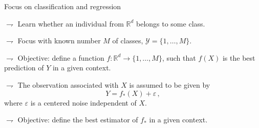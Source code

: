 \documentclass[xcolor={usenames,dvipsnames},handout]{beamer}
\begin{document}
\begin{frame}{Focus on classification and regression}


\vspace{.2cm} 

$\rightharpoondown$  Learn whether an individual from $\mathbb{R}^d$ \alert{belongs to some class}.

\vspace{.2cm} 

$\rightharpoondown$  Focus with \alert{known number $M$ of classes},   $\mathcal{Y} = \{1,\ldots,M\}$. 


\vspace{.2cm} 


$\rightharpoondown$   Objective: \alert{define a function $f: \mathbb{R}^d \to \{1,\ldots,M\}$}, such that $f(X)$ is the best prediction of $Y$ in a given context.

\vspace{.5cm}


\vspace{.2cm} 

$\rightharpoondown$ \alert{The observation associated with $X$} is assumed to be given by
$$
Y = f_*(X) + \varepsilon\,,
$$
where $\varepsilon$ is a centered noise independent of $X$. 

\vspace{.2cm} 

$\rightharpoondown$   Objective:  \alert{define the  best estimator of $f_*$ in a given context}. %
\end{frame}
\end{document}
